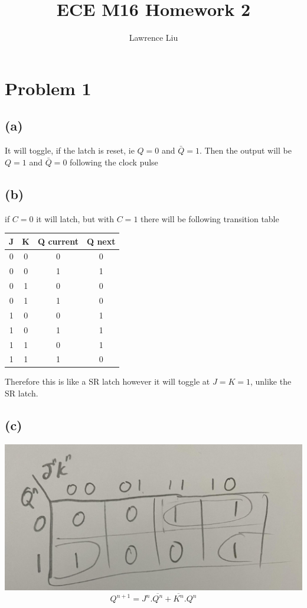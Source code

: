 \documentclass[12pt]{article}
\title{ECE M16 Homework 2}
\author{Lawrence Liu}
\begin{document}
\maketitle
\section*{Problem 1}
\subsection*{(a)}
It will toggle, if the latch is reset, ie $Q=0$ and $\bar{Q}=1$. Then the output will be $Q=1$ and $\bar{Q}=0$ following the clock pulse
\subsection*{(b)}
if $C=0$ it will latch, but with $C=1$ there will be following transition table
\begin{center}
    \begin{tabular}{|c|c|c||c|}
        J & K & Q current & Q next \\
        \hline
        0 & 0 & 0 & 0 \\
        \hline
        0 & 0 & 1 & 1 \\
        \hline
        0 & 1 & 0 & 0 \\
        \hline
        0 & 1 & 1 & 0 \\
        \hline
        1 & 0 & 0 & 1 \\
        \hline
        1 & 0 & 1 & 1 \\
        \hline
        1 & 1 & 0 & 1 \\
        \hline
        1 & 1 & 1 & 0 \\
        \hline
    \end{tabular}
\end{center}
Therefore this is like a SR latch however it will toggle at $J=K=1$, unlike the SR latch.
\subsection*{(c)}
\includegraphics[scale=0.15]{Problem1.jpg}
$$Q^{n+1}=J^{n}.\overline{Q^n}+\overline{K^n}.Q^n$$
\end{document}
